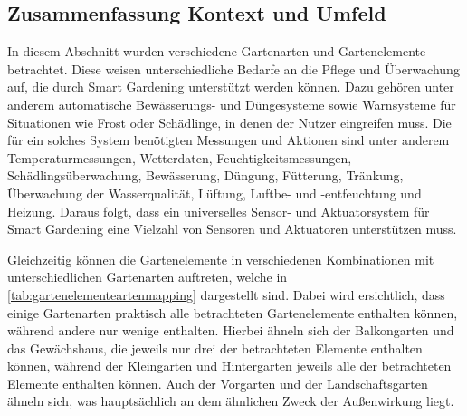 \subsection{Zusammenfassung Kontext und Umfeld}
In diesem Abschnitt wurden verschiedene Gartenarten und Gartenelemente betrachtet.
Diese weisen unterschiedliche Bedarfe an die Pflege und Überwachung auf, die durch Smart Gardening unterstützt werden können.
Dazu gehören unter anderem automatische Bewässerungs- und Düngesysteme sowie Warnsysteme für Situationen wie Frost oder Schädlinge, in denen der Nutzer eingreifen muss.
Die für ein solches System benötigten Messungen und Aktionen sind unter anderem Temperaturmessungen, Wetterdaten, Feuchtigkeitsmessungen, Schädlingsüberwachung, Bewässerung, Düngung, Fütterung, Tränkung, Überwachung der Wasserqualität, Lüftung, Luftbe- und -entfeuchtung und Heizung.
Daraus folgt, dass ein universelles Sensor- und Aktuatorsystem für Smart Gardening eine Vielzahl von Sensoren und Aktuatoren unterstützen muss.

Gleichzeitig können die Gartenelemente in verschiedenen Kombinationen mit unterschiedlichen Gartenarten auftreten, welche in \cref{tab:gartenelementeartenmapping} dargestellt sind.
Dabei wird ersichtlich, dass einige Gartenarten praktisch alle betrachteten Gartenelemente enthalten können, während andere nur wenige enthalten.
Hierbei ähneln sich der Balkongarten und das Gewächshaus, die jeweils nur drei der betrachteten Elemente enthalten können, während der Kleingarten und Hintergarten jeweils alle der betrachteten Elemente enthalten können.
Auch der Vorgarten und der Landschaftsgarten ähneln sich, was hauptsächlich an dem ähnlichen Zweck der Außenwirkung liegt.

